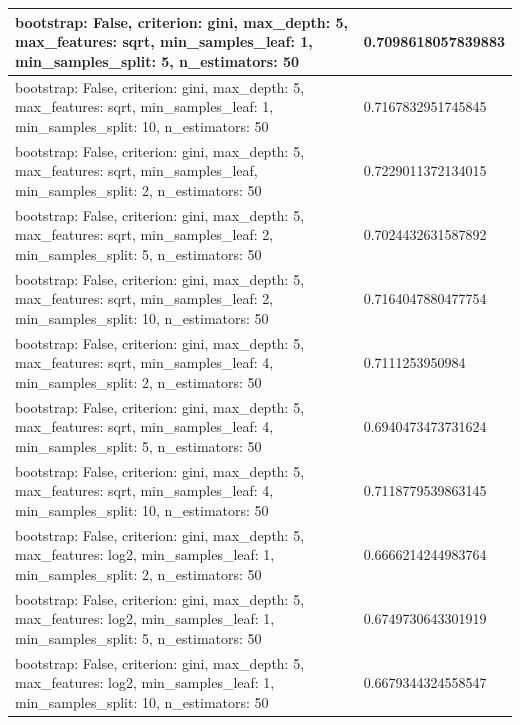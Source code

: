 \documentclass{report}
\begin{document}
{\begin{longtable}{|p{285.6px}|p{100.3px}|}
                    \hline
                    bootstrap: False, criterion: gini, max\_depth: 5, max\_features: sqrt,  min\_samples\_leaf: 1, min\_samples\_split: 5, n\_estimators: 50 & 0.7098618057839883 \\
                    
                    \hline
                    bootstrap: False, criterion: gini, max\_depth: 5, max\_features: sqrt,  min\_samples\_leaf: 1, min\_samples\_split: 10, n\_estimators: 50 & 0.7167832951745845 \\
                    \hline
                    bootstrap: False, criterion: gini, max\_depth: 5, max\_features: sqrt,  min\_samples\_leaf\: 2, min\_samples\_split: 2, n\_estimators: 50 & 0.7229011372134015 \\
                    \hline
                    bootstrap: False, criterion: gini, max\_depth: 5, max\_features: sqrt,  min\_samples\_leaf: 2, min\_samples\_split: 5, n\_estimators: 50 & 0.7024432631587892 \\
                    \hline
                    bootstrap: False, criterion: gini, max\_depth: 5, max\_features: sqrt,  min\_samples\_leaf: 2, min\_samples\_split: 10, n\_estimators: 50 & 0.7164047880477754 \\
                    \hline
                    bootstrap: False, criterion: gini, max\_depth: 5, max\_features: sqrt,  min\_samples\_leaf: 4, min\_samples\_split: 2, n\_estimators: 50 & 0.7111253950984 \\
                    \hline
                    bootstrap: False, criterion: gini, max\_depth: 5, max\_features: sqrt,  min\_samples\_leaf: 4, min\_samples\_split: 5, n\_estimators: 50 & 0.6940473473731624 \\
                    \hline
                    bootstrap: False, criterion: gini, max\_depth: 5, max\_features: sqrt,  min\_samples\_leaf: 4, min\_samples\_split: 10, n\_estimators: 50 & 0.7118779539863145 \\
                    \hline
                    bootstrap: False, criterion: gini, max\_depth: 5, max\_features: log2,  min\_samples\_leaf: 1, min\_samples\_split: 2, n\_estimators: 50 & 0.6666214244983764 \\
                    \hline
                    bootstrap: False, criterion: gini, max\_depth: 5, max\_features: log2,  min\_samples\_leaf: 1, min\_samples\_split: 5, n\_estimators: 50 & 0.6749730643301919 \\
                    \hline
                    bootstrap: False, criterion: gini, max\_depth: 5, max\_features: log2,  min\_samples\_leaf: 1, min\_samples\_split: 10, n\_estimators: 50 & 0.6679344324558547 \\

\end{longtable}}
\end{document}
